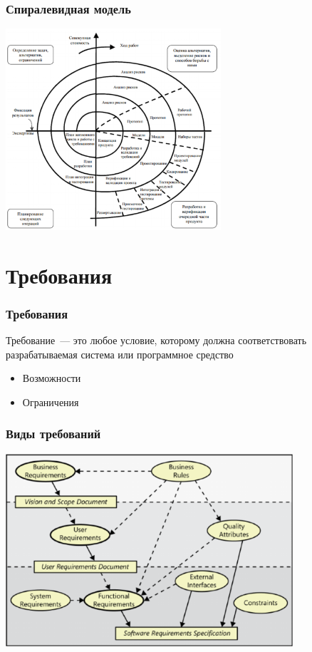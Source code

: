 \documentclass{../../slides-style}
\begin{document}
    \begin{frame}
        \frametitle{Спиралевидная модель}
        \begin{center}
            \includegraphics[width=0.6\textwidth]{spiralModel.png}
        \end{center}
    \end{frame}

    \section{Требования}

    \begin{frame}
        \frametitle{Требования}
        Требование~--- это любое условие, которому должна соответствовать разрабатываемая система или программное средство
        \begin{itemize}
            \item Возможности
            \item Ограничения
        \end{itemize}
    \end{frame}

    \begin{frame}
        \frametitle{Виды требований}
        \begin{center}
            \includegraphics[width=0.8\textwidth]{requirements.png}
        \end{center}
    \end{frame}
\end{document}
